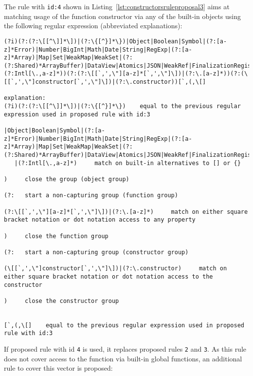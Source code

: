 The rule with \verb|id:4| shown in Listing~\ref{lst:constructorsruleproposal3} aims at matching usage of the function constructor via any of the built-in objects using the following regular expression (abbreviated explanations):

\begin{lstlisting}[style=basicStyle, caption=regex of proposed rule id:4, label={lst:constructorsruleproposalregexC}]
(?i)(?:(?:\[[^\]]*\])|(?:\{[^}]*\})|Object|Boolean|Symbol|(?:[a-z]*Error)|Number|BigInt|Math|Date|String|RegExp|(?:[a-z]*Array)|Map|Set|WeakMap|WeakSet|(?:(?:Shared)*ArrayBuffer)|DataView|Atomics|JSON|WeakRef|FinalizationRegistry|Iterator|AsyncIterator|Promise|GeneratorFunction|AsyncGeneratorFunction|Generator|AsyncGenerator|AsyncFunction|Reflect|Proxy|(?:Intl[\.,a-z]*))(?:(?:\[[`,',\"][a-z]*[`,',\"]\])|(?:\.[a-z]*))(?:(\[[`,',\"]constructor[`,',\"]\])|(?:\.constructor))[`,(,\[]

explanation:
(?i)(?:(?:\[[^\]]*\])|(?:\{[^}]*\})    equal to the previous regular expression used in proposed rule with id:3

|Object|Boolean|Symbol|(?:[a-z]*Error)|Number|BigInt|Math|Date|String|RegExp|(?:[a-z]*Array)|Map|Set|WeakMap|WeakSet|(?:(?:Shared)*ArrayBuffer)|DataView|Atomics|JSON|WeakRef|FinalizationRegistry|Iterator|AsyncIterator|Promise|GeneratorFunction|AsyncGeneratorFunction|Generator|AsyncGenerator|AsyncFunction|Reflect|Proxy
   |(?:Intl[\.,a-z]*)     match on built-in alternatives to [] or {}

)     close the group (object group)

(?:   start a non-capturing group (function group)

(?:\[[`,',\"][a-z]*[`,',\"]\])|(?:\.[a-z]*)     match on either square bracket notation or dot notation access to any property

)     close the function group

(?:   start a non-capturing group (constructor group)

(\[[`,',\"]constructor[`,',\"]\])|(?:\.constructor)     match on either square bracket notation or dot notation access to the constructor

)     close the constructor group


[`,(,\[]    equal to the previous regular expression used in proposed rule with id:3
\end{lstlisting}

If proposed rule with id \verb|4| is used, it replaces proposed rules \verb|2| and \verb|3|. As this rule does not cover access to the function via built-in global functions, an additional rule to cover this vector is proposed:


